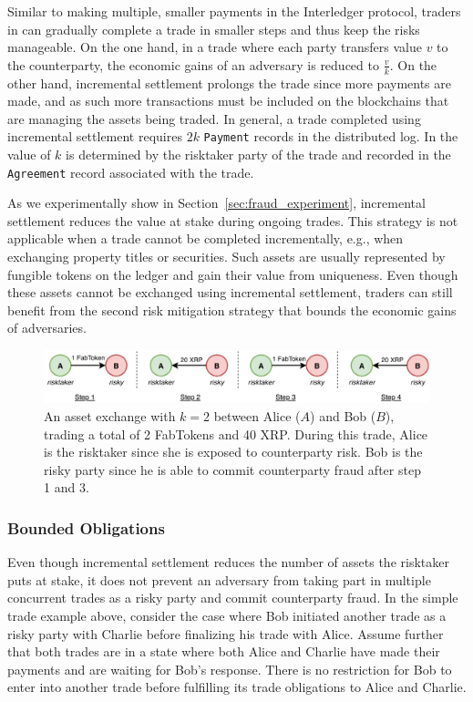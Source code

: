 Similar to making multiple, smaller payments in the Interledger protocol, traders in \ModelName{} can gradually complete a trade in smaller steps and thus keep the risks manageable.
On the one hand, in a trade where each party transfers value $ v $ to the counterparty, the economic gains of an adversary is reduced to $ \frac{v}{k} $.
On the other hand, incremental settlement prolongs the trade since more payments are made, and as such more transactions must be included on the blockchains that are managing the assets being traded.
In general, a trade completed using incremental settlement requires $ 2k $ \texttt{Payment} records in the distributed log.
In \ModelName{} the value of $ k $ is determined by the risktaker party of the trade and recorded in the \texttt{Agreement} record associated with the trade.

As we experimentally show in Section~\ref{sec:fraud_experiment}, incremental settlement reduces the value at stake during ongoing trades.
This strategy is not applicable when a trade cannot be completed incrementally, e.g., when exchanging property titles or securities.
Such assets are usually represented by fungible tokens on the ledger and gain their value from uniqueness.
Even though these assets cannot be exchanged using incremental settlement, traders can still benefit from the second risk mitigation strategy that bounds the economic gains of adversaries.

\begin{figure}[t]
	\centering
	\includegraphics[width=\linewidth]{xchange/assets/trade}
	\caption{An asset exchange with $ k = 2 $ between Alice ($ A $) and Bob ($ B $), trading a total of 2 FabTokens and 40 XRP. During this trade, Alice is the risktaker since she is exposed to counterparty risk. Bob is the risky party since he is able to commit counterparty fraud after step 1 and 3.}
	\label{fig:incremental_trade}
\end{figure}

\subsubsection{Bounded Obligations}
\label{sec:bounded_obligations}
Even though incremental settlement reduces the number of assets the risktaker puts at stake, it does not prevent an adversary from taking part in multiple concurrent trades as a risky party and commit counterparty fraud. 
In the simple trade example above, consider the case where Bob initiated another trade as a risky party with Charlie before finalizing his trade with Alice.
Assume further that both trades are in a state where both Alice and Charlie have made their payments and are waiting for Bob's response. 
There is no restriction for Bob to enter into another trade before fulfilling its trade obligations to Alice and Charlie.

